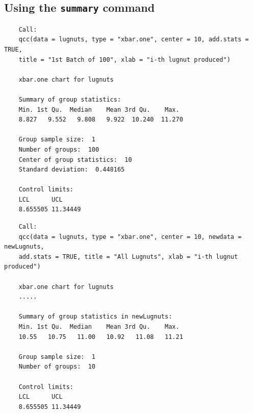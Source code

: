 \documentclass[MASTER-SPC.tex]{subfiles}
\begin{document}
\subsection{Using the \texttt{summary} command}
\begin{framed}
	\begin{verbatim}
	Call:
	qcc(data = lugnuts, type = "xbar.one", center = 10, add.stats = TRUE,     
	title = "1st Batch of 100", xlab = "i-th lugnut produced")
	
	xbar.one chart for lugnuts 
	
	Summary of group statistics:
	Min. 1st Qu.  Median    Mean 3rd Qu.    Max. 
	8.827   9.552   9.808   9.922  10.240  11.270 
	
	Group sample size:  1
	Number of groups:  100
	Center of group statistics:  10
	Standard deviation:  0.448165 
	
	Control limits:
	LCL      UCL
	8.655505 11.34449
	\end{verbatim}
\end{framed}
\begin{framed}
	\begin{verbatim}
	Call:
	qcc(data = lugnuts, type = "xbar.one", center = 10, newdata = newLugnuts,     
	add.stats = TRUE, title = "All Lugnuts", xlab = "i-th lugnut produced")
	
	xbar.one chart for lugnuts 
	.....
	
	Summary of group statistics in newLugnuts:
	Min. 1st Qu.  Median    Mean 3rd Qu.    Max. 
	10.55   10.75   11.00   10.92   11.08   11.21 
	
	Group sample size:  1
	Number of groups:  10 
	
	Control limits:
	LCL      UCL
	8.655505 11.34449
	
	\end{verbatim}
\end{framed}
\newpage
\end{document}

